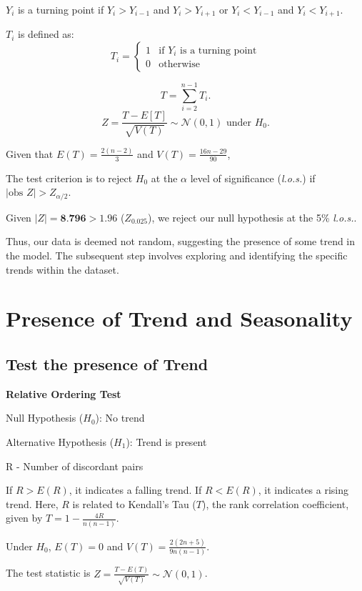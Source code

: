 \documentclass{article}
\begin{document}
\( Y_i \) is a turning point if \( Y_i > Y_{i-1} \) and \( Y_i > Y_{i+1} \) or \( Y_i < Y_{i-1} \) and \( Y_i < Y_{i+1} \). 

\( T_i \) is defined as:
\[ 
T_i = 
\begin{cases}
    1 & \text{if } Y_i \text{ is a turning point} \\
    0 & \text{otherwise}
\end{cases}
\]

\[ T = \sum_{i=2}^{n-1} T_i. \]
\[ Z = \frac{T - E[T]}{\sqrt{V(T)}} \sim \mathcal{N}(0,1) \text{ under } H_0. \]

Given that \( E(T) = \frac{2(n-2)}{3} \) and \( V(T) = \frac{16n - 29}{90} \),

The test criterion is to reject \( H_0 \) at the \( \alpha \) level of significance (\textit{l.o.s.}) if \( \lvert \text{obs } Z \rvert > Z_{\alpha/2} \).

Given \( \lvert Z \rvert = \textbf{8.796} > 1.96 \) (\( Z_{0.025} \)), we reject our null hypothesis at the 5\% \textit{l.o.s.}.

Thus, our data is deemed not random, suggesting the presence of some trend in the model. The subsequent step involves exploring and identifying the specific trends within the dataset.

\section{Presence of Trend and Seasonality}

\subsection{Test the presence of Trend }
\textbf{Relative Ordering Test}
\begin{center}
      Null Hypothesis (\(H_0\)): No trend
    
    Alternative Hypothesis (\(H_1\)): Trend is present
\end{center}
R - Number of discordant pairs

If \(R > E(R)\), it indicates a falling trend. If \(R < E(R)\), it indicates a rising trend. Here, \(R\) is related to Kendall’s Tau (\(T\)), the rank correlation coefficient, given by \(T = 1 - \frac{4R}{n(n-1)}\).

Under \(H_0\), \(E(T) = 0\) and \(V(T) = \frac{2(2n+5)}{9n(n-1)}\).

The test statistic is \(Z = \frac{T - E(T)}{\sqrt{V(T)}} \sim \mathcal{N}(0,1)\).
\end{document}
